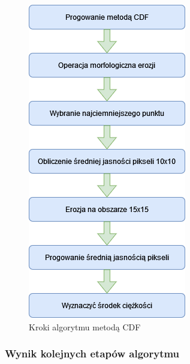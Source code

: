 \documentclass[10pt, a4paper]{article}
\begin{document}
\begin{figure}[H]
    \begin{center}
        \includegraphics[scale=0.35]{images/CDF_Diagram.png}
        \caption{Kroki algorytmu metodą CDF}
        \label{fig:cdf_diagram}
    \end{center}
\end{figure}

\subsubsection{Wynik kolejnych etapów algorytmu}
\end{document}
